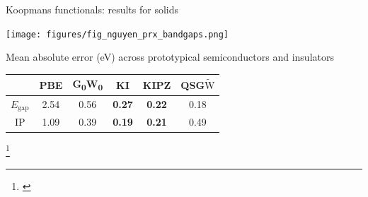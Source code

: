 \documentclass[xcolor=table,aspectratio=169]{beamer}
\newcommand\blfootcite[1]{%
  \begingroup
  \renewcommand\thefootnote{}\footnote{\hspace{-4ex}\cite{#1}}%
  \addtocounter{footnote}{-1}%
  \endgroup
}
\numberwithin{equation}{section}
\begin{document}
\begin{frame}{Koopmans functionals: results for solids}
   \begin{minipage}[c]{0.35\textwidth}
      \texttt{[image: figures/fig\_nguyen\_prx\_bandgaps.png]}
   \end{minipage}
   \hspace{1em}
   \begin{minipage}[c]{0.6\textwidth}

      \footnotesize
      Mean absolute error (eV) across prototypical semiconductors and insulators

      \vspace{1ex}
      \begin{tabular}{c S[table-format = 2.2] S[table-format = 2.2] >{\color{seaborn_red}\bfseries}S[table-format = 2.2] >{\color{seaborn_red}\bfseries}S[table-format = 2.2] S[table-format = 2.2]}
                          & {PBE} & {G\textsubscript{0}W\textsubscript{0}} & {KI} & {KIPZ} & {QSG$\tilde{\mathrm{W}}$} \\
         \midrule
         \midrule
         $E_\mathrm{gap}$ & 2.54  & 0.56                                   & 0.27 & 0.22   & 0.18                      \\
         \midrule
         IP               & 1.09  & 0.39                                   & 0.19 & 0.21   & 0.49                      \\
      \end{tabular}
   \end{minipage}

   \blfootcite{Nguyen2018}
\end{frame}
\end{document}
